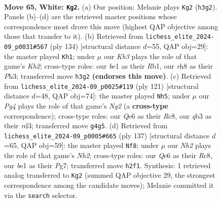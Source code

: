 \documentclass[11pt]{article}
\begin{document}
\clearpage

\begin{figure}[p]\centering
\begin{subfigure}{0.46\textwidth}\centering
\resizebox{\linewidth}{!}{%
\newchessgame
\chessboard[
  setfen={5r1r/p5p1/4Q2p/1k1p3P/p2P2P1/1q2P2K/7N/4b3 w - - 38 65},
  showmover=false,
  pgfstyle=straightmove, color=movearrow, markmove={h3-g2}
]}
\caption{}
\end{subfigure}\hfill
\begin{subfigure}{0.46\textwidth}\centering
\resizebox{\linewidth}{!}{%
\newchessgame
\chessboard[
  setfen={k2n4/r1q2p2/4p1p1/3pP3/3P3p/3Q3P/5PPK/1R6 w - - 3 68},
  showmover=false,
  pgfstyle=straightmove, color=movearrow, markmove={h2-h1}
]}
\caption{}
\end{subfigure}
\\[4pt]
\begin{subfigure}{0.46\textwidth}\centering
\resizebox{\linewidth}{!}{%
\newchessgame
\chessboard[
  setfen={2r3k1/5pn1/2P1p1p1/4q1P1/4P3/p2RQ3/2R3K1/8 b - - 3 61},
  showmover=false,
  pgfstyle=straightmove, color=movearrow, markmove={g7-h5}
]}
\caption{}
\end{subfigure}\hfill
\begin{subfigure}{0.46\textwidth}\centering
\resizebox{\linewidth}{!}{%
\newchessgame
\chessboard[
  setfen={2r4k/6pn/2BP1p1p/p4P2/3qPQPP/8/2R4K/8 b - - 0 69},
  showmover=false,
  pgfstyle=straightmove, color=movearrow, markmove={h7-f8}
]}
\caption{}
\end{subfigure}
\caption{\textbf{Move 65, White: \texttt{Kg2}.} (a) Our position; Melanie plays \texttt{Kg2} (\texttt{h3g2}). Panels (b)--(d) are the retrieved master positions whose correspondence most drove this move (highest QAP objective among those that transfer to it). (b) Retrieved from \texttt{lichess\_elite\_2024-09\_p0031\#567} (ply 134) [structural distance $d$=55, QAP obj=29]: the master played \texttt{Kh1}; under $\mu$ our \emph{Kh3} plays the role of that game's \emph{Kh2}; cross-type roles: our \emph{b}e1 as their \emph{R}b1, our \emph{r}h8 as their \emph{P}h3; transferred move \texttt{h3g2} \textbf{(endorses this move)}. (c) Retrieved from \texttt{lichess\_elite\_2024-09\_p0025\#119} (ply 121) [structural distance $d$=48, QAP obj=74]: the master played \texttt{Nh5}; under $\mu$ our \emph{Pg4} plays the role of that game's \emph{Ng2} (a \textbf{cross-type} correspondence); cross-type roles: our \emph{Q}e6 as their \emph{R}c8, our \emph{q}b3 as their \emph{r}d3; transferred move \texttt{g4g5}. (d) Retrieved from \texttt{lichess\_elite\_2024-09\_p0005\#665} (ply 137) [structural distance $d$=65, QAP obj=59]: the master played \texttt{Nf8}; under $\mu$ our \emph{Nh2} plays the role of that game's \emph{Nh2}; cross-type roles: our \emph{Q}e6 as their \emph{R}c8, our \emph{b}e1 as their \emph{P}g7; transferred move \texttt{h2f1}. Synthesis: 1 retrieved analog transferred to \texttt{Kg2} (summed QAP objective 29, the strongest correspondence among the candidate moves); Melanie committed it via the \texttt{search} selector.}
\label{fig:thought-m128}
\end{figure}
\end{document}
